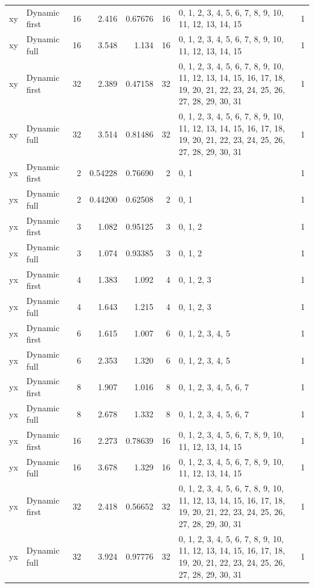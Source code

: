 \documentclass[10pt,a4paper]{article}
\begin{document}
\begin{longtable}{@{}p{23mm}p{29mm}rrrrp{36mm}r@{}}
xy & Dynamic first & 16 & 2.416 & 0.67676 & 16 & 0, 1, 2, 3, 4, 5, 6, 7, 8, 9, 10, 11, 12, 13, 14, 15 & 1 \\
xy & Dynamic full & 16 & 3.548 & 1.134 & 16 & 0, 1, 2, 3, 4, 5, 6, 7, 8, 9, 10, 11, 12, 13, 14, 15 & 1 \\
xy & Dynamic first & 32 & 2.389 & 0.47158 & 32 & 0, 1, 2, 3, 4, 5, 6, 7, 8, 9, 10, 11, 12, 13, 14, 15, 16, 17, 18, 19, 20, 21, 22, 23, 24, 25, 26, 27, 28, 29, 30, 31 & 1 \\
xy & Dynamic full & 32 & 3.514 & 0.81486 & 32 & 0, 1, 2, 3, 4, 5, 6, 7, 8, 9, 10, 11, 12, 13, 14, 15, 16, 17, 18, 19, 20, 21, 22, 23, 24, 25, 26, 27, 28, 29, 30, 31 & 1 \\
yx & Dynamic first & 2 & 0.54228 & 0.76690 & 2 & 0, 1 & 1 \\
yx & Dynamic full & 2 & 0.44200 & 0.62508 & 2 & 0, 1 & 1 \\
yx & Dynamic first & 3 & 1.082 & 0.95125 & 3 & 0, 1, 2 & 1 \\
yx & Dynamic full & 3 & 1.074 & 0.93385 & 3 & 0, 1, 2 & 1 \\
yx & Dynamic first & 4 & 1.383 & 1.092 & 4 & 0, 1, 2, 3 & 1 \\
yx & Dynamic full & 4 & 1.643 & 1.215 & 4 & 0, 1, 2, 3 & 1 \\
yx & Dynamic first & 6 & 1.615 & 1.007 & 6 & 0, 1, 2, 3, 4, 5 & 1 \\
yx & Dynamic full & 6 & 2.353 & 1.320 & 6 & 0, 1, 2, 3, 4, 5 & 1 \\
yx & Dynamic first & 8 & 1.907 & 1.016 & 8 & 0, 1, 2, 3, 4, 5, 6, 7 & 1 \\
yx & Dynamic full & 8 & 2.678 & 1.332 & 8 & 0, 1, 2, 3, 4, 5, 6, 7 & 1 \\
yx & Dynamic first & 16 & 2.273 & 0.78639 & 16 & 0, 1, 2, 3, 4, 5, 6, 7, 8, 9, 10, 11, 12, 13, 14, 15 & 1 \\
yx & Dynamic full & 16 & 3.678 & 1.329 & 16 & 0, 1, 2, 3, 4, 5, 6, 7, 8, 9, 10, 11, 12, 13, 14, 15 & 1 \\
yx & Dynamic first & 32 & 2.418 & 0.56652 & 32 & 0, 1, 2, 3, 4, 5, 6, 7, 8, 9, 10, 11, 12, 13, 14, 15, 16, 17, 18, 19, 20, 21, 22, 23, 24, 25, 26, 27, 28, 29, 30, 31 & 1 \\
yx & Dynamic full & 32 & 3.924 & 0.97776 & 32 & 0, 1, 2, 3, 4, 5, 6, 7, 8, 9, 10, 11, 12, 13, 14, 15, 16, 17, 18, 19, 20, 21, 22, 23, 24, 25, 26, 27, 28, 29, 30, 31 & 1 \\
\end{longtable}\normalsize\setlength{\tabcolsep}{6pt}
\clearpage
\end{document}
